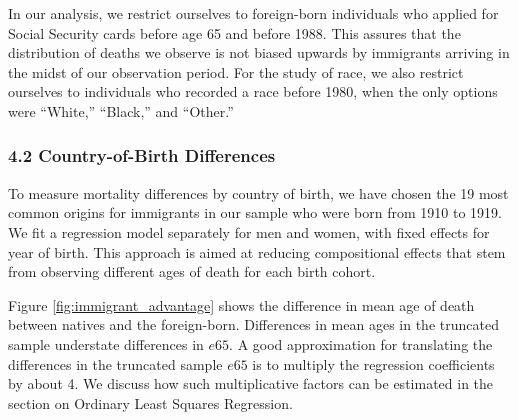\documentclass[
  11pt,
]{article}
\begin{document}
In our analysis, we restrict ourselves to foreign-born individuals who
applied for Social Security cards before age 65 and before 1988. This
assures that the distribution of deaths we observe is not biased upwards
by immigrants arriving in the midst of our observation period. For the
study of race, we also restrict ourselves to individuals who recorded a
race before 1980, when the only options were ``White,'' ``Black,'' and
``Other.''

\hypertarget{country-of-birth-differences}{%
\subsubsection{4.2 Country-of-Birth
Differences}\label{country-of-birth-differences}}

To measure mortality differences by country of birth, we have chosen the
19 most common origins for immigrants in our sample who were born from
1910 to 1919. We fit a regression model separately for men and women,
with fixed effects for year of birth. This approach is aimed at reducing
compositional effects that stem from observing different ages of death
for each birth cohort.

Figure \ref{fig:immigrant_advantage} shows the difference in mean age of
death between natives and the foreign-born. Differences in mean ages in
the truncated sample understate differences in \(e65\). A good
approximation for translating the differences in the truncated sample
\(e65\) is to multiply the regression coefficients by about 4. We
discuss how such multiplicative factors can be estimated in the section
on Ordinary Least Squares Regression.
\end{document}
